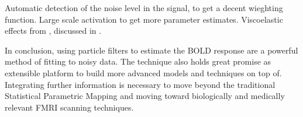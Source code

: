 Automatic detection of the noise level in the signal, to get a decent wieghting
function. Large scale activation to get more parameter estimates. 
Viscoelastic effects from \cite{Buxton2004}, discussed in \cite{Deneux2006}.

In conclusion, using particle filters to estimate the BOLD response are 
a powerful method of fitting to noisy data. The technique also
holds great promise as extensible platform to build more advanced models
and techniques on top of. Integrating further information is necessary to
move beyond the traditional Statistical Parametric Mapping and moving
toward biologically and medically relevant FMRI scanning techniques. 
